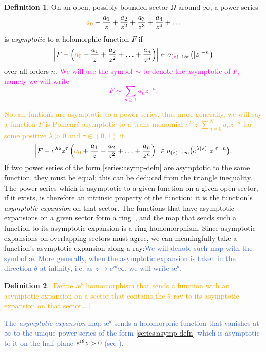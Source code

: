 \documentclass{article}
\let\Re\relax
\DeclareMathOperator{\Re}{Re}
\newcommand{\aexp}{\text{\ae}}
\theoremstyle{definition}
\newtheorem{defn}{Definition}
\theoremstyle{plain}
\begin{document}
\color{RoyalBlue}
\begin{defn}
On an open, possibly bounded sector $\Omega$ around $\infty$, a power series
\begin{equation}%
\textcolor{orange}{a_0}+\frac{a_1}{z} + \frac{a_2}{z^2} + \frac{a_3}{z^3} + \frac{a_4}{z^4} + \ldots
\end{equation}
is {\em asymptotic} to a holomorphic function $F$ if
\[ \left|F - \left(\textcolor{orange}{a_0}+\frac{a_1}{z} + \frac{a_2}{z^2} + \ldots + \frac{a_n}{z^n} \right) \right| \in o_{\textcolor{magenta}{\Re(z)} \to \infty}\big(|z|^{-n}\big) \]
over all orders $n$. \textcolor{magenta}{We will use the symbol $\sim$ to denote the asymptotic of $F$, namely we will write \[F\sim \sum_{n\geq 1} a_n z^{-n}.\]}
\end{defn}
\color{black}
\textcolor{orange}{Not all funtions are asymptotic to a power series, thus more generally, we will say a function $F$ is Poincar\'e asymptotic to a trans-monomial $e^{\lambda z}z^\tau\sum_{n=0}^Na_nz^{-n}$ for some positive $\lambda>0$ and $\tau\in(0,1)$ if 
\[\left|F - e^{\lambda z}z^{\tau}\left(\textcolor{orange}{a_0}+\frac{a_1}{z} + \frac{a_2}{z^2} + \ldots + \frac{a_n}{z^n} \right) \right| \in o_{\Re(z) \to \infty}\big(e^{\lambda\Re(z)}|z|^{\tau-n}\big).\]}
If two power series of the form \eqref{series:asymp-defn} are asymptotic to the same function, they must be equal; this can be deduced from the triangle inequality. The power series which is asymptotic to a given function on a given open sector, if it exists, is therefore an intrinsic property of the function: it is the function's {\em asymptotic expansion} on that sector. The functions that have asymptotic expansions on a given sector form a ring~\cite[Section~A.4]{nikolaev2023existence}, and the map that sends such a function to its asymptotic expansion is a ring homomorphism. Since asymptotic expansions on overlapping sectors must agree, we can meaningfully take a function's asymptotic expansion along a ray:\textcolor{RoyalBlue}{We will denote such map with the symbol $\aexp$. More generally, when the asymptotic expansion is taken in the direction $\theta$ at infinity, i.e. as $z\to e^{i\theta}\infty$, we will write $\aexp^\theta$.}  

\begin{defn}
\textcolor{orange}{[Define $\aexp^\theta$ homomorphism that sends a function with an asymptotic expansion on a sector that contains the $\theta$-ray to its asymptotic expansion on that sector.\ldots]}
\end{defn}
\textcolor{RoyalBlue}{The {\em asymptotic expansion} map $\aexp^\theta$ sends a holomorphic function that vanishes at $\infty$ to the unique power series of the form \eqref{series:asymp-defn} which is asymptotic to it on the half-plane $\Re e^{i\theta}z > 0$ (see \cite[Theorem~C.11]{nikolaev2023existence}).}
\end{document}
